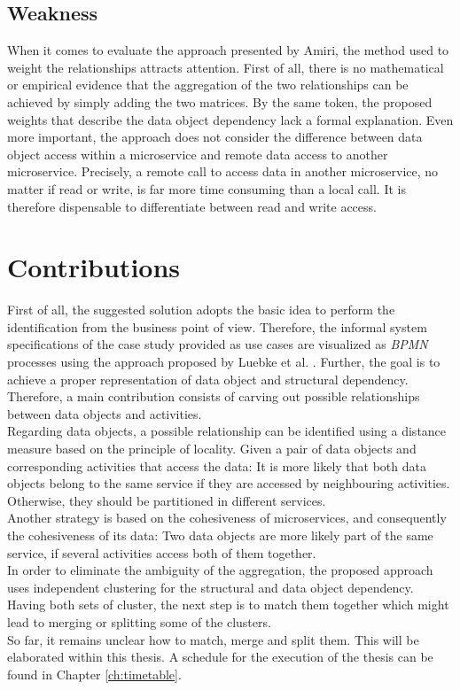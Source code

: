 \subsection{Weakness}
When it comes to evaluate the approach presented by Amiri, the method used to weight the relationships attracts attention. First of all, there is no mathematical or empirical evidence that the aggregation of the two relationships can be achieved by simply adding the two matrices. By the same token, the proposed weights that describe the data object dependency lack a formal explanation. Even more important, the approach does not consider the difference between data object access within a microservice and remote data access to another microservice. Precisely, a remote call to access data in another microservice, no matter if read or write, is far more time consuming than a local call. It is therefore dispensable to differentiate between read and write access. \\
 

\section{Contributions}
\label{sec:solutionOverview:Contributions}
First of all, the suggested solution adopts the basic idea to perform the identification from the business point of view. Therefore, the informal system specifications of the case study provided as use cases are visualized as \textit{BPMN} processes using the approach proposed by Luebke et al. \cite{Lubke}.
Further, the goal is to achieve a proper representation of data object and structural dependency. Therefore, a main contribution consists of carving out possible relationships between data objects and activities.\\
Regarding data objects, a possible relationship can be identified using a distance measure based on the principle of locality. Given a pair of data objects and corresponding activities that access the data: It is more likely that both data objects belong to the same service if they are accessed by neighbouring activities. Otherwise, they should be partitioned in different services.\\
Another strategy is based on the cohesiveness of microservices, and consequently the cohesiveness of its data: Two data objects are more likely part of the same service, if several activities access both of them together. \\
In order to eliminate the ambiguity of the aggregation, the proposed approach uses independent clustering for the structural and data object dependency. Having both sets of cluster, the next step is to match them together which might lead to merging or splitting some of the clusters. \\
So far, it remains unclear how to match, merge and split them. This will be elaborated within this thesis. A schedule for the execution of the thesis can be found in Chapter \ref{ch:timetable}.









